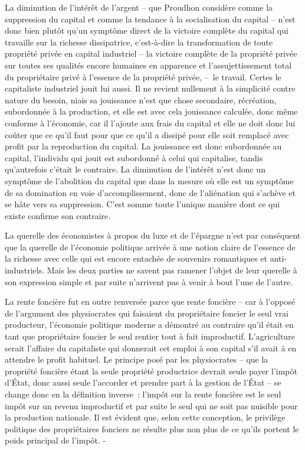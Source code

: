 \documentclass[french,twoside]{book} %
\begin{document}
La diminution de l’intérêt de l’argent – que Proudhon considère comme la suppression du capital et comme la tendance à la socialisation du capital – n’est donc bien plutôt qu’un symptôme direct de la victoire complète du capital qui travaille sur la richesse dissipatrice, c’est-à-dire la transformation de toute propriété privée en capital industriel – la victoire complète de la propriété privée sur toutes ses qualités encore humaines en apparence et l’assujettissement total du propriétaire privé à l’essence de la propriété privée, – le travail. Certes le capitaliste industriel jouit lui aussi. Il ne revient nullement à la simplicité contre nature du besoin, niais sa jouissance n’est que chose secondaire, récréation, subordonnée à la production, et elle est avec cela jouissance calculée, donc même conforme à l’économie, car il l’ajoute aux frais du capital et elle ne doit donc lui coûter que ce qu’il faut pour que ce qu’il a dissipé pour elle soit remplacé avec profit par la reproduction du capital. La jouissance est donc subordonnée au capital, l’individu qui jouit est subordonné à celui qui capitalise, tandis qu’autrefois c’était le contraire. La diminution de l’intérêt n’est donc un symptôme de l’abolition du capital que dans la mesure où elle est un symptôme de sa domination en voie d’accomplissement, donc de l’aliénation qui s’achève et se hâte vers sa suppression. C’est somme toute l’unique manière dont ce qui existe confirme son contraire.\par
La querelle des économistes à propos du luxe et de l’épargne n’est par conséquent que la querelle de l’économie politique arrivée à une notion claire de l’essence de la richesse avec celle qui est encore entachée de souvenirs romantiques et anti-industriels. Mais les deux parties ne savent pas ramener l’objet de leur querelle à son expression simple et par suite n’arrivent pas à venir à bout l’une de l’autre.\par
[XXXIV] La rente foncière fut en outre renversée parce que rente foncière – car à l’opposé de l’argument des physiocrates qui faisaient du propriétaire foncier le seul vrai producteur, l’économie politique moderne a démontré au contraire qu’il était en tant que propriétaire foncier le seul rentier tout à fait improductif. L’agriculture serait l’affaire du capitaliste qui donnerait cet emploi à son capital s’il avait à en attendre le profit habituel. Le principe posé par les physiocrates – que la propriété foncière étant la seule propriété productrice devrait seule payer l’impôt d’État, donc aussi seule l’accorder et prendre part à la gestion de l’État – se change donc en la définition inverse : l’impôt sur la rente foncière est le seul impôt sur un revenu improductif et par suite le seul qui ne soit pas nuisible pour la production nationale. Il est évident que, selon cette conception, le privilège politique des propriétaires fonciers ne résulte plus non plus de ce qu’ils portent le poids principal de l’impôt. -\par
\end{document}
